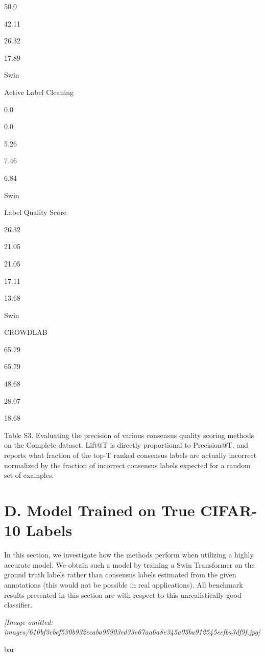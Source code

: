 \documentclass[
]{article}
\begin{document}
50.0

42.11

26.32

17.89

Swin

Active Label Cleaning

0.0

0.0

5.26

7.46

6.84

Swin

Label Quality Score

26.32

21.05

21.05

17.11

13.68

Swin

CROWDLAB

65.79

65.79

48.68

28.07

18.68

Table S3. Evaluating the precision of various consensus quality scoring
methods on the Complete dataset. Lift@T is directly proportional to
Precision@T, and reports what fraction of the top-T ranked consensus
labels are actually incorrect normalized by the fraction of incorrect
consensus labels expected for a random set of examples.

\section{D. Model Trained on True CIFAR-10
Labels}\label{d.-model-trained-on-true-cifar-10-labels}

In this section, we investigate how the methods perform when utilizing a
highly accurate model. We obtain such a model by training a Swin
Transformer on the ground truth labels rather than consensus labels
estimated from the given annotations (this would not be possible in real
applications). All benchmark results presented in this section are with
respect to this unrealistically good classifier.

\textit{[Image omitted: images/610bf3cbef530b932ecaba96903ed33e67aa6a8e345a05ba912545eefba3df9f.jpg]}

bar
\end{document}
